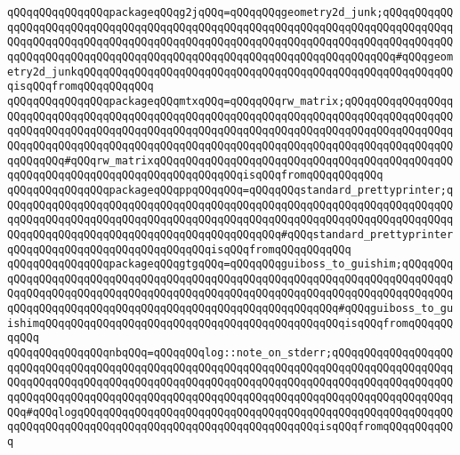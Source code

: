 \verb|qQQqqQQqqQQqqQQqpackageqQQqg2jqQQq=qQQqqQQqgeometry2d_junk;qQQqqQQqqQQqqQQqqQQqqQQqqQQqqQQqqQQqqQQqqQQqqQQqqQQqqQQqqQQqqQQqqQQqqQQqqQQqqQQqqQQqqQQqqQQqqQQqqQQqqQQqqQQqqQQqqQQqqQQqqQQqqQQqqQQqqQQqqQQqqQQqqQQqqQQqqQQqqQQqqQQqqQQqqQQqqQQqqQQqqQQqqQQqqQQqqQQqqQQqqQQqqQQqqQQq#qQQqgeometry2d_junkqQQqqQQqqQQqqQQqqQQqqQQqqQQqqQQqqQQqqQQqqQQqqQQqqQQqqQQqqQQqisqQQqfromqQQqqQQqqQQq|\newline
\verb|qQQqqQQqqQQqqQQqpackageqQQqmtxqQQq=qQQqqQQqrw_matrix;qQQqqQQqqQQqqQQqqQQqqQQqqQQqqQQqqQQqqQQqqQQqqQQqqQQqqQQqqQQqqQQqqQQqqQQqqQQqqQQqqQQqqQQqqQQqqQQqqQQqqQQqqQQqqQQqqQQqqQQqqQQqqQQqqQQqqQQqqQQqqQQqqQQqqQQqqQQqqQQqqQQqqQQqqQQqqQQqqQQqqQQqqQQqqQQqqQQqqQQqqQQqqQQqqQQqqQQqqQQqqQQqqQQqqQQqqQQq#qQQqrw_matrixqQQqqQQqqQQqqQQqqQQqqQQqqQQqqQQqqQQqqQQqqQQqqQQqqQQqqQQqqQQqqQQqqQQqqQQqqQQqqQQqqQQqisqQQqfromqQQqqQQqqQQq|\newline
\verb|qQQqqQQqqQQqqQQqpackageqQQqppqQQqqQQq=qQQqqQQqstandard_prettyprinter;qQQqqQQqqQQqqQQqqQQqqQQqqQQqqQQqqQQqqQQqqQQqqQQqqQQqqQQqqQQqqQQqqQQqqQQqqQQqqQQqqQQqqQQqqQQqqQQqqQQqqQQqqQQqqQQqqQQqqQQqqQQqqQQqqQQqqQQqqQQqqQQqqQQqqQQqqQQqqQQqqQQqqQQqqQQqqQQqqQQqqQQq#qQQqstandard_prettyprinterqQQqqQQqqQQqqQQqqQQqqQQqqQQqqQQqisqQQqfromqQQqqQQqqQQq|\newline
\verb|qQQqqQQqqQQqqQQqpackageqQQqgtgqQQq=qQQqqQQqguiboss_to_guishim;qQQqqQQqqQQqqQQqqQQqqQQqqQQqqQQqqQQqqQQqqQQqqQQqqQQqqQQqqQQqqQQqqQQqqQQqqQQqqQQqqQQqqQQqqQQqqQQqqQQqqQQqqQQqqQQqqQQqqQQqqQQqqQQqqQQqqQQqqQQqqQQqqQQqqQQqqQQqqQQqqQQqqQQqqQQqqQQqqQQqqQQqqQQqqQQqqQQqqQQq#qQQqguiboss_to_guishimqQQqqQQqqQQqqQQqqQQqqQQqqQQqqQQqqQQqqQQqqQQqqQQqisqQQqfromqQQqqQQqqQQq|\newline
\newline
\verb|qQQqqQQqqQQqqQQqnbqQQq=qQQqqQQqlog::note_on_stderr;qQQqqQQqqQQqqQQqqQQqqQQqqQQqqQQqqQQqqQQqqQQqqQQqqQQqqQQqqQQqqQQqqQQqqQQqqQQqqQQqqQQqqQQqqQQqqQQqqQQqqQQqqQQqqQQqqQQqqQQqqQQqqQQqqQQqqQQqqQQqqQQqqQQqqQQqqQQqqQQqqQQqqQQqqQQqqQQqqQQqqQQqqQQqqQQqqQQqqQQqqQQqqQQqqQQqqQQqqQQqqQQqqQQqqQQq#qQQqlogqQQqqQQqqQQqqQQqqQQqqQQqqQQqqQQqqQQqqQQqqQQqqQQqqQQqqQQqqQQqqQQqqQQqqQQqqQQqqQQqqQQqqQQqqQQqqQQqqQQqqQQqqQQqisqQQqfromqQQqqQQqqQQq|\newline

